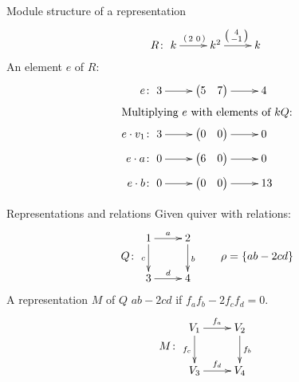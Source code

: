 \begin{frame}{Module structure of a representation}
\[
R \colon
\xymatrix{
k   \ar[r]^{\left( \begin{smallmatrix} 2 & 0 \end{smallmatrix} \right)} &
k^2 \ar[r]^{\left( \begin{smallmatrix} 4 \\ -1 \end{smallmatrix} \right)} &
k
}
\]
An element $e$ of $R$:
\begin{align*}
e &\colon
\xymatrix{
3   \ar[r] &
{\VV{5}{7}} \ar[r] &
4
}
\\
\intertext{Multiplying $e$ with elements of $kQ$:}
e \cdot v_1 &\colon
\xymatrix{
3   \ar[r] &
{\VV{0}{0}} \ar[r] &
0
}
\\
e \cdot a &\colon
\xymatrix{
0   \ar[r] &
{\VV{6}{0}} \ar[r] &
0
}
\\
e \cdot b &\colon
\xymatrix{
0   \ar[r] &
{\VV{0}{0}} \ar[r] &
13
}
\end{align*}
\end{frame}

\begin{frame}{Representations and relations}
Given quiver with relations:
\[
Q \colon
\vcenter{\xymatrix{
1\ar[r]^a\ar[d]_c & 2\ar[d]^b\\
3\ar[r]^d & 4
}}
\qquad
\rho = \{ ab - 2cd \}
\]
A representation $M$ of $Q$ 
$ab - 2cd$ if $f_a f_b - 2 f_c f_d = 0$.
\[
M \colon
\vcenter{\xymatrix{
V_1 \ar[r]^{f_a} \ar[d]_{f_c} &
V_2 \ar[d]^{f_b} \\
V_3 \ar[r]^{f_d} &
V_4
}}
\]
\end{frame}

